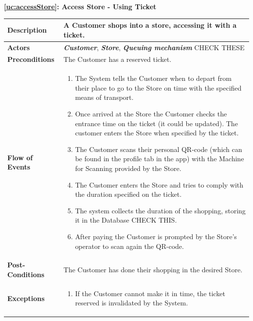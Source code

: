 \documentclass[a4paper, 10pt, oneside]{article}
\newcommand*{\lorenzo}[1]{\textcolor{BurntOrange}{#1}}
\begin{document}
\begin{center}
{\textbf{\ref{uc:accessStore}: Access Store - Using Ticket}}
\end{center}
\begin{tabularx}{\linewidth}{| l | X |}
	
	\hline
	\textbf{Description} & A Customer shops into a store, accessing it with a ticket.\\
	

	\hline
	\textbf{Actors} & \textbf{\textit{Customer}}, \textit{\textbf{Store}}, \textit{\textbf{Queuing mechanism}}  \lorenzo{CHECK THESE}\\
	
	\hline
	\textbf{Preconditions} & The Customer has a reserved ticket.\\
	
	\hline
	\textbf{Flow of Events} & \parbox{0.7\textwidth}{	
		\begin{enumerate}
			\item The System tells the Customer when to depart from their place to go to the Store on time with the specified means of transport.
			\item Once arrived at the Store the Customer checks the entrance time on the ticket (it could be updated). The customer enters the Store when specified by the ticket.
			\item The Customer scans their personal QR-code (which can be found in the profile tab in the app) with the Machine for Scanning provided by the Store.
			\item The Customer enters the Store and tries to comply with the duration specified on the ticket.
			\item The system collects the duration of the shopping, storing it in the Database \lorenzo{CHECK THIS}.
			\item After paying the Customer is prompted by the Store's operator to scan again the QR-code.
	\end{enumerate}}\\
	
	\hline
	\textbf{Post-Conditions} & The Customer has done their shopping in the desired Store.\\
	
	\hline
	\textbf{Exceptions} & \parbox{0.7\textwidth}{ \begin{enumerate}
			\item If the Customer cannot make it in time, the ticket reserved is invalidated by the System.
		\end{enumerate}}\\

	\hline
	
\end{tabularx}
\end{document}
